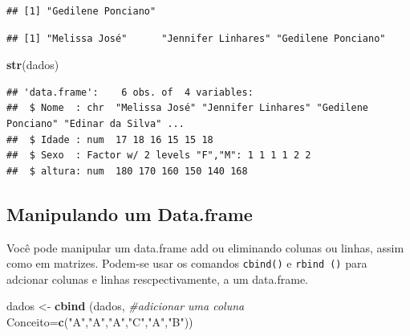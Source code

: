 \documentclass[]{book}
\newenvironment{Shaded}{\begin{snugshade}}{\end{snugshade}}
\newcommand{\CommentTok}[1]{\textcolor[rgb]{0.56,0.35,0.01}{\textit{#1}}}
\newcommand{\DataTypeTok}[1]{\textcolor[rgb]{0.13,0.29,0.53}{#1}}
\newcommand{\DecValTok}[1]{\textcolor[rgb]{0.00,0.00,0.81}{#1}}
\newcommand{\KeywordTok}[1]{\textcolor[rgb]{0.13,0.29,0.53}{\textbf{#1}}}
\newcommand{\NormalTok}[1]{#1}
\newcommand{\OperatorTok}[1]{\textcolor[rgb]{0.81,0.36,0.00}{\textbf{#1}}}
\newcommand{\StringTok}[1]{\textcolor[rgb]{0.31,0.60,0.02}{#1}}
\begin{document}
\begin{verbatim}
## [1] "Gedilene Ponciano"
\end{verbatim}

\begin{Shaded}
\end{Shaded}

\begin{verbatim}
## [1] "Melissa José"      "Jennifer Linhares" "Gedilene Ponciano"
\end{verbatim}

\begin{Shaded}
\begin{Highlighting}[]
\KeywordTok{str}\NormalTok{(dados)}
\end{Highlighting}
\end{Shaded}

\begin{verbatim}
## 'data.frame':    6 obs. of  4 variables:
##  $ Nome  : chr  "Melissa José" "Jennifer Linhares" "Gedilene Ponciano" "Edinar da Silva" ...
##  $ Idade : num  17 18 16 15 15 18
##  $ Sexo  : Factor w/ 2 levels "F","M": 1 1 1 1 2 2
##  $ altura: num  180 170 160 150 140 168
\end{verbatim}

\hypertarget{manipulando-um-data.frame}{%
\subsection{Manipulando um Data.frame}\label{manipulando-um-data.frame}}

Você pode manipular um data.frame add ou eliminando colunas ou linhas, assim como em matrizes. Podem-se usar os comandos \texttt{cbind()} e \texttt{rbind\ ()} para adcionar colunas e linhas rescpectivamente, a um data.frame.

\begin{Shaded}
\begin{Highlighting}[]
\NormalTok{dados <-}\StringTok{ }\KeywordTok{cbind}\NormalTok{ (dados, }\CommentTok{#adicionar uma coluna}
               \DataTypeTok{Conceito=}\KeywordTok{c}\NormalTok{(}\StringTok{"A"}\NormalTok{,}\StringTok{"A"}\NormalTok{,}\StringTok{"A"}\NormalTok{,}\StringTok{"C"}\NormalTok{,}\StringTok{"A"}\NormalTok{,}\StringTok{"B"}\NormalTok{))}
\end{Highlighting}
\end{Shaded}
\end{document}
